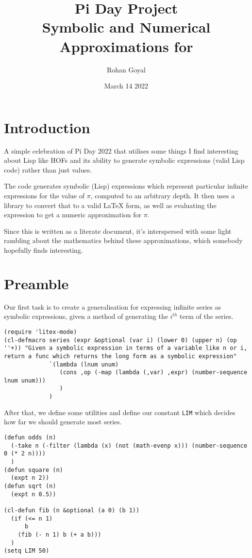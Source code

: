 \documentclass[11pt]{article}
\author{Rohan Goyal }
\date{March 14 2022}
\title{Pi Day Project\\\medskip
\large Symbolic and Numerical Approximations for \pi}
\begin{document}
\maketitle
\tableofcontents

\section{Introduction}
\label{sec:org42a76eb}
A simple celebration of Pi Day 2022 that utilises some things I find interesting about Lisp like HOFs and its ability to generate symbolic expressions (valid Lisp code) rather than just values.

The code generates symbolic (Lisp) expressions which represent particular infinite expressions for the value of \(\pi\), computed to an arbitrary depth. It then uses a library to convert that to a valid \LaTeX{} form, as well as evaluating the expression to get a numeric approximation for \(\pi\).

Since this is written as a literate document, it's interspersed with some light rambling about the mathematics behind these approximations, which somebody hopefully finds interesting.

\section{Preamble}
\label{sec:orga911361}
Our first task is to create a generalisation for expressing infinite series as symbolic expressions, given a method of generating the \(i^{th}\) term of the series.
\begin{verbatim}
(require 'litex-mode)
(cl-defmacro series (expr &optional (var i) (lower 0) (upper n) (op ''+)) "Given a symbolic expression in terms of a variable like n or i, return a func which returns the long form as a symbolic expression"
             `(lambda (lnum unum)
                (cons ,op (-map (lambda (,var) ,expr) (number-sequence lnum unum)))
                )
             )
\end{verbatim}

After that, we define some utilities and define our constant \texttt{LIM} which decides how far we should generate most series.
\begin{verbatim}
(defun odds (n)
  (-take n (-filter (lambda (x) (not (math-evenp x))) (number-sequence 0 (* 2 n))))
  )
(defun square (n)
  (expt n 2))
(defun sqrt (n)
  (expt n 0.5))

(cl-defun fib (n &optional (a 0) (b 1))
  (if (<= n 1)
      b
    (fib (- n 1) b (+ a b)))
  )
(setq LIM 50)
\end{verbatim}
\end{document}
